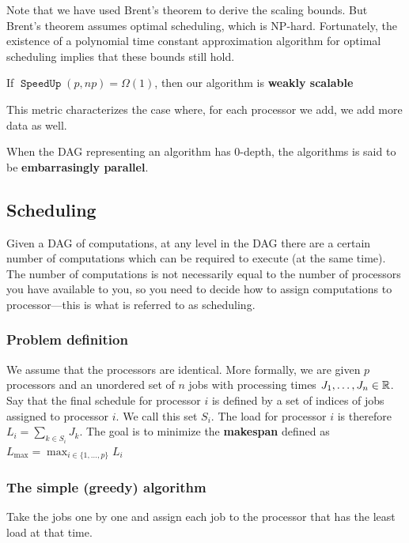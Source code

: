\documentclass[11pt]{article}
\DeclareMathOperator{\SpeedUp}{\texttt{SpeedUp}}
\begin{document}
Note that we have used Brent's theorem to derive the scaling bounds. But Brent's theorem assumes
optimal scheduling, which is NP-hard. Fortunately, the existence of a polynomial time constant
approximation algorithm for optimal scheduling implies that these bounds still hold.

\begin{definition}
If \(\SpeedUp(p,np)=\Omega(1)\), then our algorithm is \textbf{weakly scalable}
\end{definition}

This metric characterizes the case where, for each processor we add, we add more data as well.

\begin{definition}
When the DAG representing an algorithm has 0-depth, the algorithms is said to be \textbf{embarrasingly parallel}.
\end{definition}
\subsection{Scheduling}
\label{sec:org0174fd2}
Given a DAG of computations, at any level in the DAG there are a certain number of computations
which can be required to execute (at the same time). The number of computations is not necessarily
equal to the number of processors you have available to you, so you need to decide how to assign
computations to processor—this is what is referred to as scheduling.
\subsubsection{Problem definition}
\label{sec:orgcf4f0f1}
\begin{notation}[]
We assume that the processors are identical. More formally, we are given \(p\) processors and an
unordered set of \(n\) jobs with processing times \(J_1,\dots,J_n\in\mathbb{R}\). Say that the final schedule
for processor \(i\) is defined by a set of indices of jobs assigned to processor \(i\). We call
this set \(S_i\). The load for processor \(i\) is therefore \(L_i=\sum_{k\in S_i}J_k\). The goal is to
minimize the \textbf{makespan} defined as \(L_{\max}=\max_{i\in\{1,\dots,p\}}L_i\)
\end{notation}
\subsubsection{The simple (greedy) algorithm}
\label{sec:org64a22cf}
Take the jobs one by one and assign each job to the processor that has the least load at that time.
\end{document}
